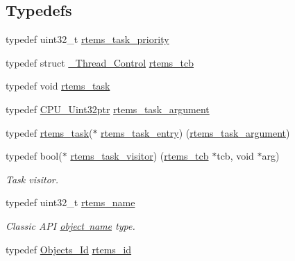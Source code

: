\subsection*{Typedefs}
\begin{DoxyCompactItemize}
\item 
typedef uint32\+\_\+t \mbox{\hyperlink{group__ClassicTasks_gaa80a0c0938307d1e99d0eb5fee765b47}{rtems\+\_\+task\+\_\+priority}}
\item 
typedef struct \mbox{\hyperlink{struct__Thread__Control}{\+\_\+\+Thread\+\_\+\+Control}} \mbox{\hyperlink{group__ClassicTasks_gadd9f38f296a7833767355b8236f68908}{rtems\+\_\+tcb}}
\item 
typedef void \mbox{\hyperlink{group__ClassicTasks_gadf265d2ec26417f16d856514bd9d9394}{rtems\+\_\+task}}
\item 
typedef \mbox{\hyperlink{group__RTEMSScoreCPUARM_ga9fca17f81f850e128fcc8ed5b87ff2ab}{C\+P\+U\+\_\+\+Uint32ptr}} \mbox{\hyperlink{group__ClassicTasks_gaf202f985ef5a3156f29eae99a0536842}{rtems\+\_\+task\+\_\+argument}}
\item 
typedef \mbox{\hyperlink{group__ClassicTasks_gadf265d2ec26417f16d856514bd9d9394}{rtems\+\_\+task}}($\ast$ \mbox{\hyperlink{group__ClassicTasks_ga3232e2350ecd8d85855ab1f6ec186828}{rtems\+\_\+task\+\_\+entry}}) (\mbox{\hyperlink{group__ClassicTasks_gaf202f985ef5a3156f29eae99a0536842}{rtems\+\_\+task\+\_\+argument}})
\item 
typedef bool($\ast$ \mbox{\hyperlink{group__ClassicTasks_ga861b5d2aa73bff68304c15cbb2b9c688}{rtems\+\_\+task\+\_\+visitor}}) (\mbox{\hyperlink{group__ClassicTasks_gadd9f38f296a7833767355b8236f68908}{rtems\+\_\+tcb}} $\ast$tcb, void $\ast$arg)
\begin{DoxyCompactList}\small\item\em Task visitor. \end{DoxyCompactList}\item 
typedef uint32\+\_\+t \mbox{\hyperlink{group__ClassicTasks_ga55fb63c49f68c0cbd9bee004da15b1fd}{rtems\+\_\+name}}
\begin{DoxyCompactList}\small\item\em Classic A\+PI \mbox{\hyperlink{group__RTEMSAPIClassic_ClassicRTEMSSubSecObjectNames}{object name}} type. \end{DoxyCompactList}\item 
\mbox{\label{group__ClassicTasks_gab20892b814dced7dd4e5b9bf42becd57}} 
typedef \mbox{\hyperlink{group__RTEMSScoreObject_ga5821f52a51072941bdd603e542d0863e}{Objects\+\_\+\+Id}} \mbox{\hyperlink{group__ClassicTasks_gab20892b814dced7dd4e5b9bf42becd57}{rtems\+\_\+id}}

\end{DoxyCompactItemize}

